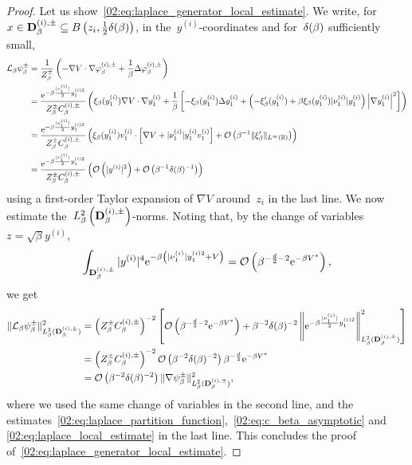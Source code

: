 \begin{proof}
            Let us show~\eqref{02:eq:laplace_generator_local_estimate}. We write, for~$x \in \mathbf{D}_\beta^{(i),\pm} \subseteq B\left(z_i,\frac12\delta(\beta)\right)$, in the~$y^{(i)}$-coordinates and for~$\delta(\beta)$ sufficiently small,
            \begin{align*}
                \mathcal{L}_\beta\psi^{\pm}_\beta &= \frac1{Z_\beta^{\pm}}\left(-\nabla V \cdot \nabla \varphi_\beta^{(i),\pm} + \frac1\beta\Delta\varphi_\beta^{(i),\pm}\right)\\
                &=\frac{\mathrm{e}^{-\beta\frac{|\nu^{(i)}_{1}|}{2}y_1^{(i)2}}}{Z_\beta^\pm C_\beta^{(i),\pm}}\left(\xi_\beta(y_1^{(i)})\nabla V \cdot \nabla y_1^{(i)}+\frac1\beta\left[- \xi_\beta(y_1^{(i)})\Delta y_1^{(i)} + \left(-\xi_\beta'(y_1^{(i)})+\beta \xi_\beta(y_1^{(i)})|\nu^{(i)}_{1}|y_1^{(i)}\right)\abs{\nabla y_1^{(i)}}^2\right]\right)\\
                &= \frac{\mathrm{e}^{-\beta\frac{|\nu^{(i)}_{1}|}{2}y_1^{(i)2}}}{Z_\beta^\pm C_\beta^{(i),\pm}}\left(\xi_\beta(y_1^{(i)})v^{(i)}_{1}\cdot\left[\nabla V+|\nu^{(i)}_{1}|y_1^{(i)}v^{(i)}_{1}\right]+\mathcal{O}\left(\beta^{-1}\|\xi_\beta'\|_{L^\infty(\mathbb{R})}\right)\right)\\
                &=\frac{\mathrm{e}^{-\beta\frac{|\nu^{(i)}_{1}|}{2}y_1^{(i)2}}}{Z_\beta^\pm C_\beta^{(i),\pm}}\left(\mathcal{O}\left(|y^{(i)}|^2\right)+\mathcal{O}\left(\beta^{-1}\delta(\beta)^{-1}\right)\right)
            \end{align*}
            using a first-order Taylor expansion of $\nabla V$ around~$z_i$ in the last line. We now estimate the~$L_\beta^2\left(\mathbf{D}_\beta^{(i),\pm}\right)$-norms.
            Noting that, by the change of variables~$z = \sqrt\beta y^{(i)}$,
            \[\int_{\mathbf{D}_\beta^{(i),\pm}}|y^{(i)}|^4\mathrm{e}^{-\beta\left(|\nu^{(i)}_{1}|y_1^{(i)2}+V\right)}=\mathcal{O}\left(\beta^{-\frac{d}2-2}\mathrm{e}^{-\beta V^*}\right),\]
            we get
            \begin{equation}
                \begin{aligned}
                \|\mathcal{L}_\beta\psi_\beta^{\pm}\|^2_{L_\beta^2(\mathbf{D}_\beta^{(i),\pm})} &= \left(Z_\beta^\pm C_\beta^{(i),\pm}\right)^{-2}\left[\mathcal{O}\left(\beta^{-\frac{d}2-2}\mathrm{e}^{-\beta V^*}\right)+\beta^{-2}\delta(\beta)^{-2}\left\|\mathrm{e}^{-\beta\frac{|\nu^{(i)}_{1}|}{2}y_1^{(i)2}}\right\|^2_{L_\beta^2(\mathbf{D}_\beta^{(i),\pm})}\right]\\
                &=\left(Z_\beta^{\pm}C_\beta^{(i),\pm}\right)^{-2}\mathcal{O}\left(\beta^{-2}\delta(\beta)^{-2}\right)\beta^{-\frac d2}\mathrm{e}^{-\beta V^*}\\
                &=\mathcal{O}\left(\beta^{-2}\delta(\beta)^{-2}\right)\|\nabla \psi_\beta^\pm\|^2_{L_\beta^2(\mathbf{D}_\beta^{(i),\pm})},
                \end{aligned}
            \end{equation}
            where we used the same change of variables in the second line, and the estimates~\eqref{02:eq:laplace_partition_function},~\eqref{02:eq:c_beta_asymptotic} and \eqref{02:eq:laplace_local_estimate} in the last line.
            This concludes the proof of~\eqref{02:eq:laplace_generator_local_estimate}.
        \end{proof}

